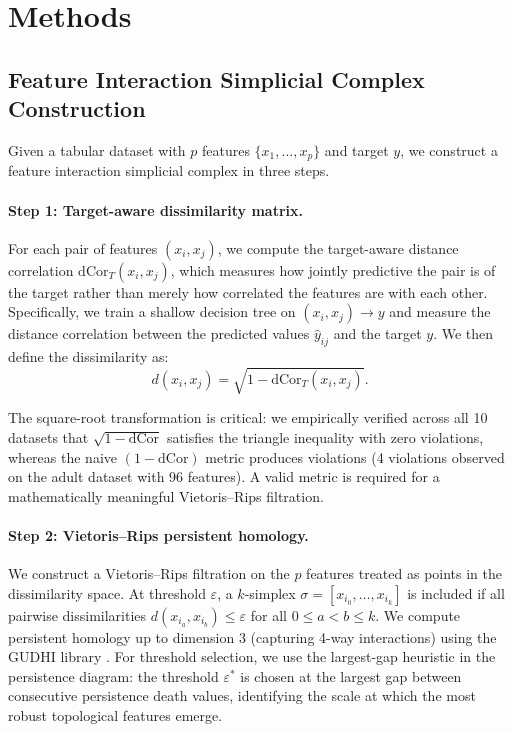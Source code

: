 \documentclass[11pt,letterpaper]{article}
\begin{document}
\section{Methods}
\label{sec:methods}

\subsection{Feature Interaction Simplicial Complex Construction}
\label{sec:complex}

Given a tabular dataset with $p$ features $\{x_1, \ldots, x_p\}$ and target $y$, we construct a feature interaction simplicial complex in three steps.

\paragraph{Step 1: Target-aware dissimilarity matrix.}
For each pair of features $(x_i, x_j)$, we compute the target-aware distance correlation $\text{dCor}_T(x_i, x_j)$, which measures how jointly predictive the pair is of the target rather than merely how correlated the features are with each other. Specifically, we train a shallow decision tree on $(x_i, x_j) \to y$ and measure the distance correlation between the predicted values $\hat{y}_{ij}$ and the target $y$. We then define the dissimilarity as:
\begin{equation}
    d(x_i, x_j) = \sqrt{1 - \text{dCor}_T(x_i, x_j)}.
    \label{eq:dissimilarity}
\end{equation}

The square-root transformation is critical: we empirically verified across all 10 datasets that $\sqrt{1 - \text{dCor}}$ satisfies the triangle inequality with zero violations, whereas the naive $(1 - \text{dCor})$ metric produces violations (4 violations observed on the adult dataset with 96 features). A valid metric is required for a mathematically meaningful Vietoris--Rips filtration.

\paragraph{Step 2: Vietoris--Rips persistent homology.}
We construct a Vietoris--Rips filtration on the $p$ features treated as points in the dissimilarity space. At threshold $\varepsilon$, a $k$-simplex $\sigma = [x_{i_0}, \ldots, x_{i_k}]$ is included if all pairwise dissimilarities $d(x_{i_a}, x_{i_b}) \leq \varepsilon$ for all $0 \leq a < b \leq k$. We compute persistent homology up to dimension 3 (capturing 4-way interactions) using the GUDHI library \citep{Maria2014}. For threshold selection, we use the largest-gap heuristic in the persistence diagram: the threshold $\varepsilon^*$ is chosen at the largest gap between consecutive persistence death values, identifying the scale at which the most robust topological features emerge.
\end{document}
